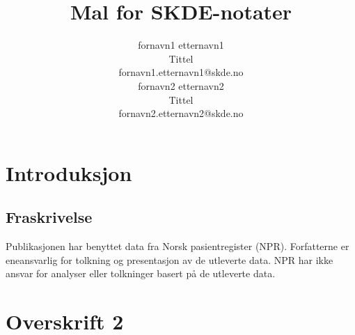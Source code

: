 \documentclass[a4paper]{article}
\title{Mal for SKDE-notater} %
\author{%
    fornavn1 etternavn1 \\
    Tittel \\
    fornavn1.etternavn1@skde.no\vspace{20pt} \\
    fornavn2 etternavn2 \\
    Tittel \\
    fornavn2.etternavn2@skde.no
}
\begin{document}

\addtocounter{page}{1}
\begin{large}

\section*{Introduksjon}

\lipsum[1-2]

\subsection*{Fraskrivelse} %

Publikasjonen har benyttet data fra Norsk pasientregister (NPR). Forfatterne er eneansvarlig for tolkning og presentasjon av de utleverte data. NPR har ikke ansvar for analyser eller tolkninger basert på de utleverte data.

\section*{Overskrift 2}

\lipsum[3-4]

\end{large}
\end{document}
